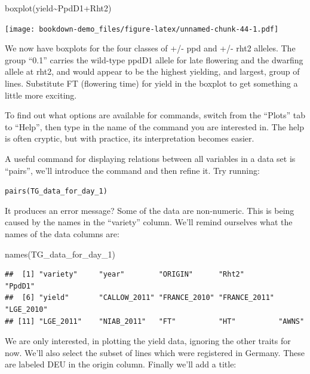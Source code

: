 \documentclass[
]{book}
\newenvironment{Shaded}{\begin{snugshade}}{\end{snugshade}}
\newcommand{\FunctionTok}[1]{\textcolor[rgb]{0.00,0.00,0.00}{#1}}
\newcommand{\NormalTok}[1]{#1}
\newcommand{\SpecialCharTok}[1]{\textcolor[rgb]{0.00,0.00,0.00}{#1}}
\begin{document}
\begin{Shaded}
\begin{Highlighting}[]
\FunctionTok{boxplot}\NormalTok{(yield}\SpecialCharTok{\textasciitilde{}}\NormalTok{PpdD1}\SpecialCharTok{+}\NormalTok{Rht2)}
\end{Highlighting}
\end{Shaded}

\texttt{[image: bookdown-demo\_files/figure-latex/unnamed-chunk-44-1.pdf]}

We now have boxplots for the four classes of +/- ppd and +/- rht2 alleles. The group ``0.1'' carries the wild-type ppdD1 allele for late flowering and the dwarfing allele at rht2, and would appear to be the highest yielding, and largest, group of lines. Substitute FT (flowering time) for yield in the boxplot to get something a little more exciting.

To find out what options are available for commands, switch from the ``Plots'' tab to ``Help'', then type in the name of the command you are interested in. The help is often cryptic, but with practice, its interpretation becomes easier.

A useful command for displaying relations between all variables in a data set is ``pairs'', we'll introduce the command and then refine it. Try running:

\texttt{pairs(TG\_data\_for\_day\_1)}

It produces an error message? Some of the data are non-numeric. This is being caused by the names in the ``variety'' column. We'll remind ourselves what the names of the data columns are:

\begin{Shaded}
\begin{Highlighting}[]
\FunctionTok{names}\NormalTok{(TG\_data\_for\_day\_1)}
\end{Highlighting}
\end{Shaded}

\begin{verbatim}
##  [1] "variety"     "year"        "ORIGIN"      "Rht2"        "PpdD1"      
##  [6] "yield"       "CALLOW_2011" "FRANCE_2010" "FRANCE_2011" "LGE_2010"   
## [11] "LGE_2011"    "NIAB_2011"   "FT"          "HT"          "AWNS"
\end{verbatim}

We are only interested, in plotting the yield data, ignoring the other traits for now. We'll also select the subset of lines which were registered in Germany. These are labeled DEU in the origin column. Finally we'll add a title:
\end{document}
